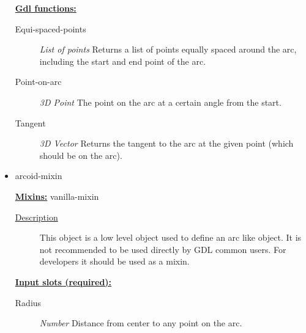 \documentclass [11pt]{book}
\begin{document}
\begin{itemize}
\textbf{
\underline{Gdl functions:}}

\begin{description}

\item [Equi-spaced-points]
\emph{List of points} Returns a list of points equally spaced around the arc, including
the start and end point of the arc.


\item [Point-on-arc]
\emph{3D Point} The point on the arc at a certain angle from the start.


\item [Tangent]
\emph{3D Vector} Returns the tangent to the arc at the given point (which should be on the arc).


\end{description}







\item {}arcoid-mixin


\textbf{
\underline{Mixins:}} vanilla-mixin





\begin{description}

\item [
\underline{Description}]


This object is a low level object used to define 
an arc like object. It is not recommended to be used directly by GDL common users. 
For developers it should be used as a mixin.



\end{description}








\textbf{
\underline{Input slots (required):}}

\begin{description}

\item [Radius]
\emph{Number} Distance from center to any point on the arc.


\end{description}







\end{itemize}
\end{document}
